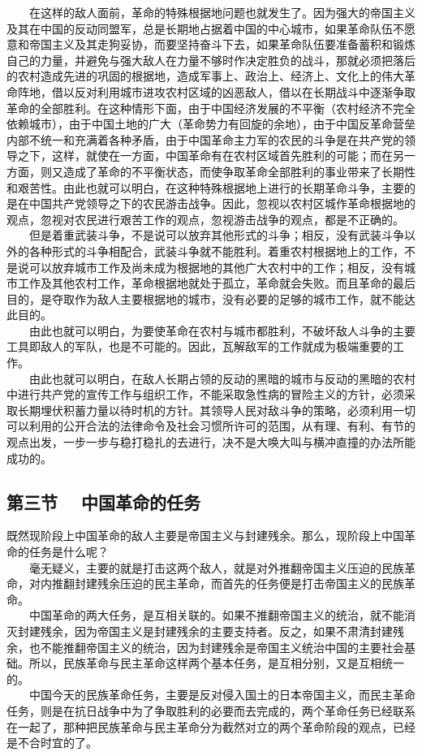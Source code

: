 \documentclass[cn,11pt,chinese]{elegantbook}
\def\myformat#1{\hfil\hfil #1}
\begin{document}
　　在这样的敌人面前，革命的特殊根据地问题也就发生了。因为强大的帝国主义及其在中国的反动同盟军，总是长期地占据着中国的中心城市，如果革命队伍不愿意和帝国主义及其走狗妥协，而要坚持奋斗下去，如果革命队伍要准备蓄积和锻炼自己的力量，并避免与强大敌人在力量不够时作决定胜负的战斗，那就必须把落后的农村造成先进的巩固的根据地，造成军事上、政治上、经济上、文化上的伟大革命阵地，借以反对利用城市进攻农村区域的凶恶敌人，借以在长期战斗中逐渐争取革命的全部胜利。在这种情形下面，由于中国经济发展的不平衡（农村经济不完全依赖城市），由于中国土地的广大（革命势力有回旋的余地），由于中国反革命营垒内部不统一和充满着各种矛盾，由于中国革命主力军的农民的斗争是在共产党的领导之下，这样，就使在一方面，中国革命有在农村区域首先胜利的可能；而在另一方面，则又造成了革命的不平衡状态，而使争取革命全部胜利的事业带来了长期性和艰苦性。由此也就可以明白，在这种特殊根据地上进行的长期革命斗争，主要的是在中国共产党领导之下的农民游击战争。因此，忽视以农村区城作革命根据地的观点，忽视对农民进行艰苦工作的观点，忽视游击战争的观点，都是不正确的。\\
　　但是着重武装斗争，不是说可以放弃其他形式的斗争；相反，没有武装斗争以外的各种形式的斗争相配合，武装斗争就不能胜利。着重农村根据地上的工作，不是说可以放弃城市工作及尚未成为根据地的其他广大农村中的工作；相反，没有城市工作及其他农村工作，革命根据地就处于孤立，革命就会失败。而且革命的最后目的，是夺取作为敌人主要根据地的城市，没有必要的足够的城市工作，就不能达此目的。\\
　　由此也就可以明白，为要使革命在农村与城市都胜利，不破坏敌人斗争的主要工具即敌人的军队，也是不可能的。因此，瓦解敌军的工作就成为极端重要的工作。\\
　　由此也就可以明白，在敌人长期占领的反动的黑暗的城市与反动的黑暗的农村中进行共产党的宣传工作与组织工作，不能采取急性病的冒险主义的方针，必须采取长期埋伏积蓄力量以待时机的方针。其领导人民对敌斗争的策略，必须利用一切可以利用的公开合法的法律命令及社会习惯所许可的范围，从有理、有利、有节的观点出发，一步一步与稳打稳扎的去进行，决不是大唤大叫与横冲直撞的办法所能成功的。\\
\subsection*{\myformat{第三节 　中国革命的任务}}
既然现阶段上中国革命的敌人主要是帝国主义与封建残余。那么，现阶段上中国革命的任务是什么呢？\\
　　毫无疑义，主要的就是打击这两个敌人，就是对外推翻帝国主义压迫的民族革命，对内推翻封建残余压迫的民主革命，而首先的任务便是打击帝国主义的民族革命。\\
　　中国革命的两大任务，是互相关联的。如果不推翻帝国主义的统治，就不能消灭封建残余，因为帝国主义是封建残余的主要支持者。反之，如果不肃清封建残余，也不能推翻帝国主义的统治，因为封建残余是帝国主义统治中国的主要社会基础。所以，民族革命与民主革命这样两个基本任务，是互相分别，又是互相统一的。\\
　　中国今天的民族革命任务，主要是反对侵入国土的日本帝国主义，而民主革命任务，则是在抗日战争中为了争取胜利的必要而去完成的，两个革命任务已经联系在一起了，那种把民族革命与民主革命分为截然对立的两个革命阶段的观点，已经是不合时宜的了。\\
\end{document}
